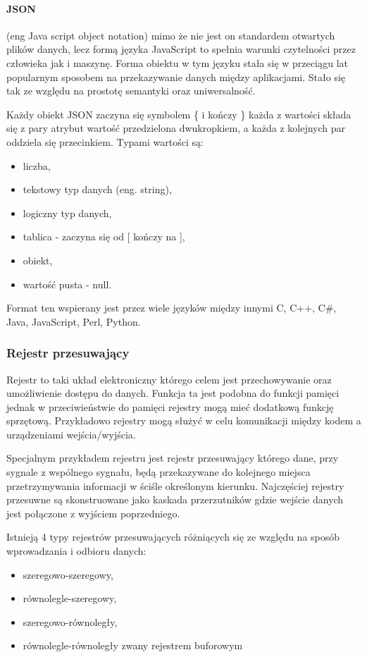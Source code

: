 \paragraph{JSON }
 
(eng Java script object notation) mimo że nie jest on standardem otwartych plików danych, lecz formą języka JavaScript to spełnia warunki czytelności przez człowieka jak i maszynę. 
Forma obiektu w tym języku stała się w przeciągu lat popularnym sposobem na przekazywanie danych między aplikacjami. Stało się tak ze względu na prostotę semantyki oraz uniwersalność. 

Każdy obiekt JSON zaczyna się symbolem \{ i kończy \} każda z wartości składa się z pary atrybut wartość przedzielona dwukropkiem, a każda z kolejnych par oddziela się przecinkiem. Typami wartości są:
\begin{itemize}
        \item liczba, 
        \item tekstowy typ danych (eng. string),
        \item logiczny typ danych,
        \item tablica - zaczyna się od [ kończy na ],
        \item obiekt,
        \item wartość pusta - null. 
\end{itemize}

Format ten wspierany jest przez wiele języków między innymi C, C++, C\#, Java, JavaScript, Perl, Python\cite{json}.

\subsubsection{Rejestr przesuwający}
Rejestr to taki układ elektroniczny którego celem jest przechowywanie oraz umożliwienie dostępu do danych. Funkcja ta jest podobna do funkcji pamięci jednak w przeciwieństwie do pamięci rejestry mogą mieć dodatkową funkcję sprzętową.
Przykładowo rejestry mogą służyć w celu komunikacji między kodem a urządzeniami wejścia/wyjścia.

Specjalnym przykładem rejestru jest rejestr przesuwający którego dane, przy sygnale z wspólnego sygnału, będą przekazywane do kolejnego miejsca przetrzymywania informacji w ściśle określonym kierunku.  
Najczęściej rejestry przesuwne są skonstruowane jako kaskada przerzutników gdzie wejście danych jest połączone z wyjściem poprzedniego.

Istnieją 4 typy rejestrów przesuwających różniących się ze względu na sposób wprowadzania i odbioru danych:
\begin{itemize}
        \item szeregowo-szeregowy,
        \item równolegle-szeregowy,
        \item szeregowo-równoległy,
        \item równolegle-równoległy zwany rejestrem buforowym  
\end{itemize} 
